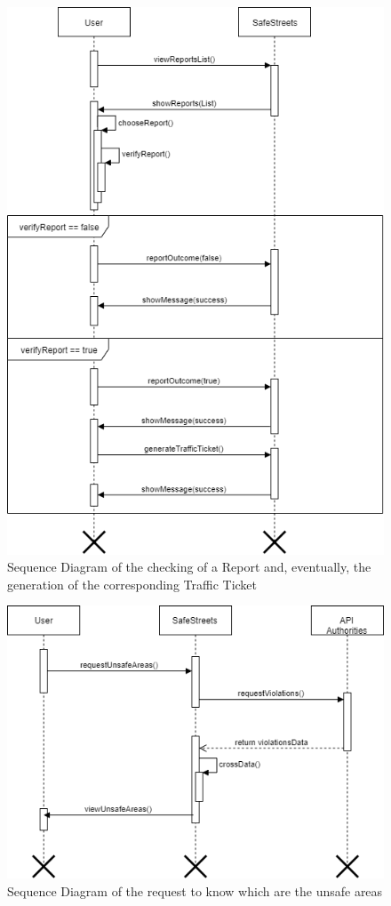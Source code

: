     \begin{figure}[H]
        \centering
        \includegraphics[scale=0.5]{Images/SeqDiag_generateTrafficTicket.png}
        \caption{Sequence Diagram of the checking of a Report and, eventually, the generation of the corresponding Traffic Ticket}
    \end{figure}
    
    \begin{figure}[H]
        \centering
        \includegraphics[scale=0.5]{Images/SeqDiag_unsafeAreas.png}
        \caption{Sequence Diagram of the request to know which are the unsafe areas}
   \end{figure}
